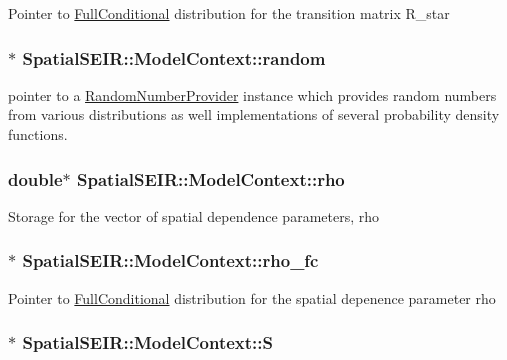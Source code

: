 Pointer to \hyperlink{classSpatialSEIR_1_1FullConditional}{Full\-Conditional} distribution for the transition matrix R\-\_\-star \hypertarget{classSpatialSEIR_1_1ModelContext_a752872a2e8bb09bbf8b2c400860f5c33}{
\subsubsection[{random}]{$\ast$ Spatial\-S\-E\-I\-R\-::\-Model\-Context\-::random}}\label{classSpatialSEIR_1_1ModelContext_a752872a2e8bb09bbf8b2c400860f5c33}
pointer to a \hyperlink{classSpatialSEIR_1_1RandomNumberProvider}{Random\-Number\-Provider} instance which provides random numbers from various distributions as well implementations of several probability density functions. \hypertarget{classSpatialSEIR_1_1ModelContext_a633cc9f969abeeb3ad9d3147023af13f}{
\subsubsection[{rho}]{\setlength{\rightskip}{0pt plus 5cm}double$\ast$ Spatial\-S\-E\-I\-R\-::\-Model\-Context\-::rho}}\label{classSpatialSEIR_1_1ModelContext_a633cc9f969abeeb3ad9d3147023af13f}
Storage for the vector of spatial dependence parameters, rho \hypertarget{classSpatialSEIR_1_1ModelContext_a894f23aa95ff98664b2cf71443cde6e5}{
\subsubsection[{rho\-\_\-fc}]{$\ast$ Spatial\-S\-E\-I\-R\-::\-Model\-Context\-::rho\-\_\-fc}}\label{classSpatialSEIR_1_1ModelContext_a894f23aa95ff98664b2cf71443cde6e5}
Pointer to \hyperlink{classSpatialSEIR_1_1FullConditional}{Full\-Conditional} distribution for the spatial depenence parameter rho \hypertarget{classSpatialSEIR_1_1ModelContext_afa683f7f79821d957107d301dfe392c1}{
\subsubsection[{S}]{$\ast$ Spatial\-S\-E\-I\-R\-::\-Model\-Context\-::\-S}}\label{classSpatialSEIR_1_1ModelContext_afa683f7f79821d957107d301dfe392c1}
